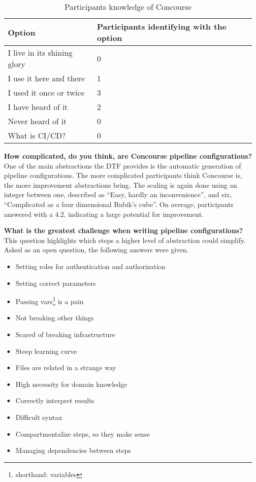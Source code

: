 \begin{table}[H]
    \centering
    \caption{Participants knowledge of Concourse}
    \label{tab:participants-knowledge-of-concourse}
    \begin{tabular}{l|l}
        Option & Participants identifying with the option \\
        \hline
        I live in its shining glory & 0 \\
        I use it here and there & 1 \\
        I used it once or twice & 3 \\
        I have heard of it & 2 \\
        Never heard of it & 0 \\
        What is CI/CD? & 0 \\
    \end{tabular}
\end{table}

\textbf{How complicated, do you think, are Concourse pipeline configurations?}\\
One of the main abstractions the DTF provides is the automatic generation of pipeline configurations.
The more complicated participants think Concourse is, the more improvement abstractions bring.
The scaling is again done using an integer between one, described as ``Easy, hardly an inconvenience'', and six, ``Complicated as a four dimensional Rubik's cube''.
On average, participants answered with a $4.2$, indicating a large potential for improvement.

\textbf{What is the greatest challenge when writing pipeline configurations?}\\
This question highlights which steps a higher level of abstraction could simplify.
Asked as an open question, the following answers were given.

\begin{itemize}
    \item Setting roles for authentication and authorization
    \item Setting correct parameters
    \item Passing vars\footnote{shorthand: variables} is a pain
    \item Not breaking other things
    \item Scared of breaking infrastructure
    \item Steep learning curve
    \item Files are related in a strange way
    \item High necessity for domain knowledge
    \item Correctly interpret results
    \item Difficult syntax
    \item Compartmentalize steps, so they make sense
    \item Managing dependencies between steps
\end{itemize}

